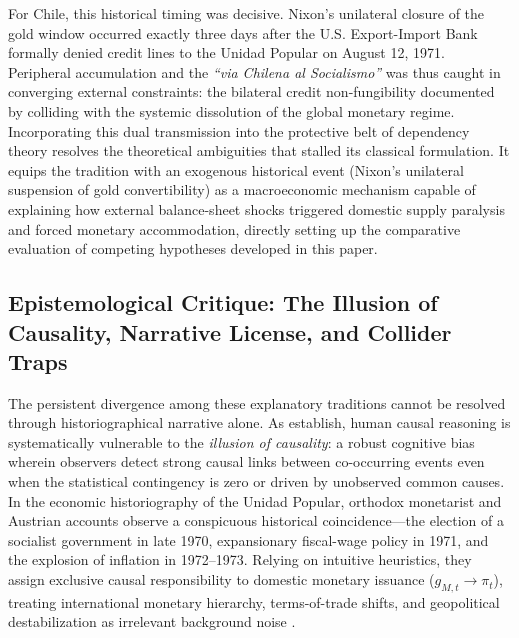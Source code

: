 For Chile, this historical timing was decisive. Nixon's unilateral closure of the gold window 
occurred exactly three days after the U.S. Export-Import Bank formally denied credit lines to the Unidad Popular on August 12, 1971. Peripheral accumulation and the \textit{``via Chilena al Socialismo''} was thus caught in converging external constraints: the bilateral credit non-fungibility documented by \citet{Stallings1978} colliding with the systemic dissolution of the global monetary regime. Incorporating this dual transmission into the protective belt of dependency theory resolves the theoretical ambiguities that stalled its classical formulation. It equips the tradition with an exogenous historical event (Nixon's unilateral suspension of gold convertibility) as a macroeconomic mechanism capable of explaining how external balance-sheet shocks triggered domestic supply paralysis and forced monetary accommodation, directly setting up the comparative evaluation of competing hypotheses developed in this paper.  

\subsection{Epistemological Critique: The Illusion of Causality, Narrative License, and Collider Traps}
\label{sec:epistemological_critique}

The persistent divergence among these explanatory traditions cannot be resolved through historiographical narrative alone. As \citet{BlancoMatute2018} establish, human causal reasoning is systematically vulnerable to the \emph{illusion of causality}: a robust cognitive bias wherein observers detect strong causal links between co-occurring events even when the statistical contingency is zero or driven by unobserved common causes. In the economic historiography of the Unidad Popular, orthodox monetarist and Austrian accounts observe a conspicuous historical coincidence---the election of a socialist government in late 1970, expansionary fiscal-wage policy in 1971, and the explosion of inflation in 1972--1973. Relying on intuitive heuristics, they assign exclusive causal responsibility to domestic monetary issuance ($g_{M,t} \to \pi_t$), treating international monetary hierarchy, terms-of-trade shifts, and geopolitical destabilization as irrelevant background noise \citep{Edwards2024,EspinosaVejar2025}.

